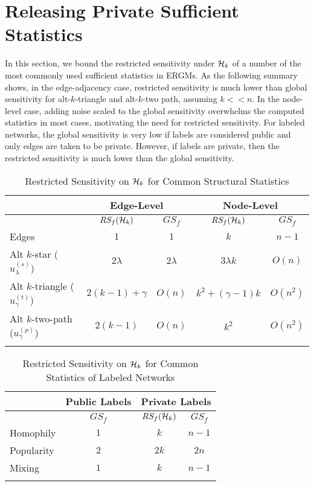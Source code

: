\section{Releasing Private Sufficient Statistics}
\label{sec:release_suff_stats}

In this section, we bound the restricted sensitivity under $\mathcal{H}_{k}$ of a number of the most commonly used sufficient statistics in ERGMs. As the following summary shows, in the edge-adjacency case, restricted sensitivity is much lower than global sensitivity for alt-$k$-triangle and alt-$k$-two path, assuming $k << n$. In the node-level case, adding noise scaled to the global sensitivity overwhelms the computed statistics in most cases, motivating the need for restricted sensitivity. For labeled networks, the global sensitivity is very low if labels are considered public and only edges are taken to be private. However, if labels are private, then the restricted sensitivity is much lower than the global sensitivity. 

\begin{table}[!ht]
	\caption{Restricted Sensitivity on $\mathcal{H}_k$ for Common Structural Statistics}
	\begin{center}
	\begin{tabular}{|l|c|c|c|c|}
		\hhline{|=====|}
		 & \multicolumn{2}{c|}{Edge-Level} & \multicolumn{2}{c|}{Node-Level} \\\hline
		& $RS_f(\mathcal{H}_k)$ & $GS_f$ & $RS_f(\mathcal{H}_k)$ & $GS_f$ \\ \hline
		Edges & $1$ & $1$ & $k$  & $n-1$\\ \hline
		Alt $k$-star ($u_\lambda^{(s)}$) & $2\lambda$ & $2\lambda$  & $3 \lambda k$  & $O(n)$\\ \hline
		Alt $k$-triangle  ($u_\gamma^{(t)}$)  & $2(k-1) + \gamma$ & $O(n)$  & $k^2 + (\gamma -1)k$ & $O(n^2)$\\ \hline
		Alt $k$-two-path  ($u_\gamma^{(p)}$)  & $2(k-1)$ & $O(n)$    & $k^2$ & $O(n^2)$\\	
		\hhline{|=====|}
	\end{tabular}
	\end{center}
\end{table}

\begin{table}[!ht]
		\caption{Restricted Sensitivity on $\mathcal{H}_k$ for Common Statistics of  Labeled Networks}
		\begin{center}
		\begin{tabular}{|l|c|c|c|}
		\hhline{|====|}
		& \multicolumn{1}{c|}{Public Labels} & \multicolumn{2}{c|}{Private Labels} \\\hline
		 & $GS_f$ & $RS_f(\mathcal{H}_k)$ & $GS_f$ \\ \hline
		Homophily &  $1$ & $k$  & $n-1$\\ \hline
		Popularity  & $2$  & $2k$ & $2n$\\ \hline
		Mixing & $1$    & $k$ & $n-1$\\	 \hhline{|====|}
	\end{tabular}
	\end{center}
\end{table}


